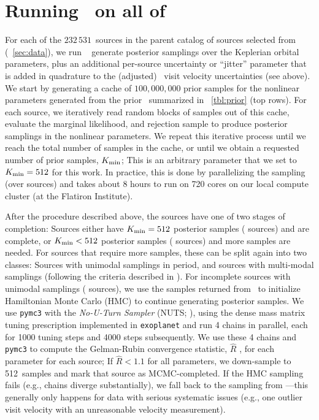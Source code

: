 \documentclass[modern]{aastex63}
\newcommand{\nsources}{\ensuremath{232\,531}}
\newcommand{\Kmin}{K_{\rm min}}
\newcommand{\Kminval}{512}
\begin{document}
\section{Running \thejoker\ on all of \apogee\ } \label{sec:rundr16}

For each of the \nsources\ sources in the parent catalog of sources selected
from \apogee\  (\sectionname~\ref{sec:data}), we run \thejoker\
\citep{thejoker} generate posterior samplings over the Keplerian orbital
parameters, plus an additional per-source uncertainty or ``jitter'' parameter
that is added in quadrature to the (adjusted) \apogee\ visit velocity
uncertainties (see above).
We start by generating a cache of $100,000,000$ prior samples for the nonlinear
parameters generated from the prior \pdf\ summarized in
\tablename~\ref{tbl:prior} (top rows).
For each source, we iteratively read random blocks of samples out of this cache,
evaluate the marginal likelihood, and rejection sample to produce posterior
samplings in the nonlinear parameters.
We repeat this iterative process until we reach the total number of samples in
the cache, or until we obtain a requested number of prior samples, $\Kmin$; This
is an arbitrary parameter that we set to $K_{\rm min} = \Kminval$ for this work.
In practice, this is done by parallelizing the sampling (over sources) and takes
about 8 hours to run on 720 cores on our local compute cluster (at the Flatiron
Institute).

After the procedure described above, the sources have one of two stages of
completion: Sources either have $\Kmin = \Kminval$ posterior samples (
sources) and are complete, or $\Kmin < \Kminval$ posterior samples (\todo{XX}
sources) and more samples are needed.
For sources that require more samples, these can be split again into two
classes: Sources with unimodal samplings in period, and sources with multi-modal
samplings (following the criteria described in \citealt{thejoker}).
For incomplete sources with unimodal samplings (\todo{XX} sources), we use the
samples returned from \thejoker\ to initialize Hamiltonian Monte Carlo (HMC) to
continue generating posterior samples.
We use \texttt{pymc3} with the \emph{No-U-Turn Sampler} (NUTS; \citealt{NUTS}),
using the dense mass matrix tuning prescription implemented in
\texttt{exoplanet} \citep{exoplanet:exoplanet} and run 4 chains in parallel,
each for 1000 tuning steps and 4000 steps subsequently.
We use these 4 chains and \texttt{pymc3} to compute the Gelman-Rubin convergence
statistic, $\hat{R}$ \citep{Gelman:1992}, for each parameter for each source; If
$\hat{R} < 1.1$ for all parameters, we down-sample to \Kminval\ samples and mark
that source as MCMC-completed.
If the HMC sampling fails (e.g., chains diverge substantially), we fall back to
the sampling from \thejoker---this generally only happens for data with serious
systematic issues (e.g., one outlier visit velocity with an unreasonable
velocity measurement).
\end{document}
